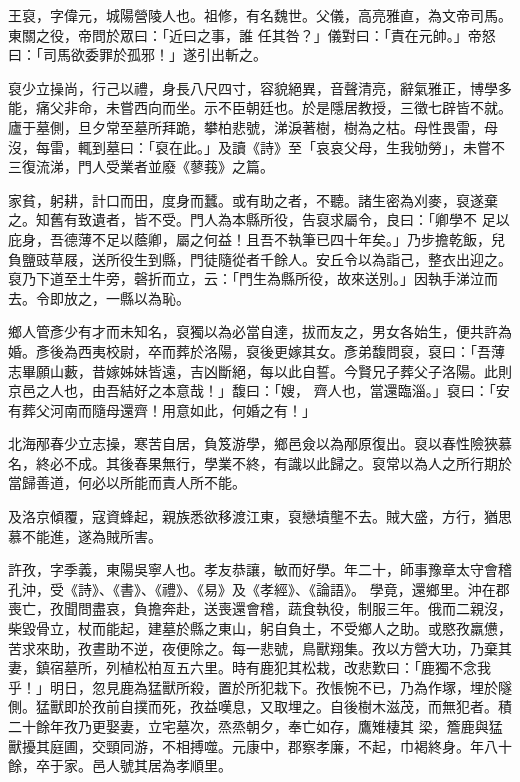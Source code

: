 \begin{pinyinscope}
 王裒，字偉元，城陽營陵人也。祖修，有名魏世。父儀，高亮雅直，為文帝司馬。東關之役，帝問於眾曰：「近曰之事，誰
 任其咎？」儀對曰：「責在元帥。」帝怒曰：「司馬欲委罪於孤邪！」遂引出斬之。



 裒少立操尚，行己以禮，身長八尺四寸，容貌絕異，音聲清亮，辭氣雅正，博學多能，痛父非命，未嘗西向而坐。示不臣朝廷也。於是隱居教授，三徵七辟皆不就。廬于墓側，旦夕常至墓所拜跪，攀柏悲號，涕淚著樹，樹為之枯。母性畏雷，母沒，每雷，輒到墓曰：「裒在此。」及讀《詩》至「哀哀父母，生我劬勞」，未嘗不三復流涕，門人受業者並廢《蓼莪》之篇。



 家貧，躬耕，計口而田，度身而蠶。或有助之者，不聽。諸生密為刈麥，裒遂棄之。知舊有致遺者，皆不受。門人為本縣所役，告裒求屬令，良曰：「卿學不
 足以庇身，吾德薄不足以蔭卿，屬之何益！且吾不執筆已四十年矣。」乃步擔乾飯，兒負鹽豉草屐，送所役生到縣，門徒隨從者千餘人。安丘令以為詣己，整衣出迎之。裒乃下道至土牛旁，磬折而立，云：「門生為縣所役，故來送別。」因執手涕泣而去。令即放之，一縣以為恥。



 鄉人管彥少有才而未知名，裒獨以為必當自達，拔而友之，男女各始生，便共許為婚。彥後為西夷校尉，卒而葬於洛陽，裒後更嫁其女。彥弟馥問裒，裒曰：「吾薄志畢願山藪，昔嫁姊妹皆遠，吉凶斷絕，每以此自誓。今賢兄子葬父子洛陽。此則京邑之人也，由吾結好之本意哉！」馥曰：「嫂，
 齊人也，當還臨淄。」裒曰：「安有葬父河南而隨母還齊！用意如此，何婚之有！」



 北海邴春少立志操，寒苦自居，負笈游學，鄉邑僉以為邴原復出。裒以春性險狹慕名，終必不成。其後春果無行，學業不終，有識以此歸之。裒常以為人之所行期於當歸善道，何必以所能而責人所不能。



 及洛京傾覆，寇資蜂起，親族悉欲移渡江東，裒戀墳壟不去。賊大盛，方行，猶思慕不能進，遂為賊所害。



 許孜，字季義，東陽吳寧人也。孝友恭讓，敏而好學。年二十，師事豫章太守會稽孔沖，受《詩》、《書》、《禮》、《易》及《孝經》、《論語》。
 學竟，還鄉里。沖在郡喪亡，孜聞問盡哀，負擔奔赴，送喪還會稽，蔬食執役，制服三年。俄而二親沒，柴毀骨立，杖而能起，建墓於縣之東山，躬自負土，不受鄉人之助。或愍孜羸憊，苦求來助，孜晝助不逆，夜便除之。每一悲號，鳥獸翔集。孜以方營大功，乃棄其妻，鎮宿墓所，列植松柏亙五六里。時有鹿犯其松栽，改悲歎曰：「鹿獨不念我乎！」明日，忽見鹿為猛獸所殺，置於所犯栽下。孜悵惋不已，乃為作塚，埋於隧側。猛獸即於孜前自撲而死，孜益嘆息，又取埋之。自後樹木滋茂，而無犯者。積二十餘年孜乃更娶妻，立宅墓次，烝烝朝夕，奉亡如存，鷹雉棲其
 梁，簷鹿與猛獸擾其庭圃，交頸同游，不相搏噬。元康中，郡察孝廉，不起，巾褐終身。年八十餘，卒于家。邑人號其居為孝順里。




\end{pinyinscope}
